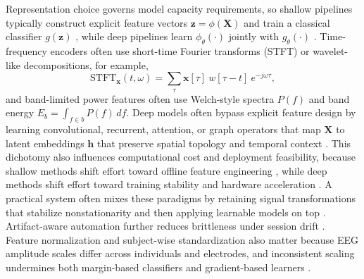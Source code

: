 \documentclass{WileyMSP-template}
\begin{document}
Representation choice governs model capacity requirements, so shallow pipelines typically construct explicit feature vectors $\mathbf{z}=\phi(\mathbf{X})$ and train a classical classifier $g(\mathbf{z})$ \cite{sbwank2019ikknpred}, while deep pipelines learn $\phi_\theta(\cdot)$ jointly with $g_\theta(\cdot)$ \cite{yroyhb2019deeplear}. Time-frequency encoders often use short-time Fourier transforms (STFT) or wavelet-like decompositions, for example,
\begin{equation}
\mathrm{STFT}_{\mathbf{x}}(t,\omega)=\sum_{\tau}\mathbf{x}[\tau]\ w[\tau-t]\ e^{-j\omega\tau},
\end{equation}
and band-limited power features often use Welch-style spectra $P(f)$ and band energy $E_b=\int_{f\in b}P(f)\,df$. Deep models often bypass explicit feature design by learning convolutional, recurrent, attention, or graph operators that map $\mathbf{X}$ to latent embeddings $\mathbf{h}$ that preserve spatial topology and temporal context \cite{sliuxw2020subjecti}. This dichotomy also influences computational cost and deployment feasibility, because shallow methods shift effort toward offline feature engineering \cite{thzhou2020waveletb}, while deep methods shift effort toward training stability and hardware acceleration \cite{jcheng2021emotionr}. A practical system often mixes these paradigms by retaining signal transformations that stabilize nonstationarity and then applying learnable models on top \cite{cysain2018automate}. Artifact-aware automation further reduces brittleness under session drift \cite{sphadi2021automati}. Feature normalization and subject-wise standardization also matter because EEG amplitude scales differ across individuals and electrodes, and inconsistent scaling undermines both margin-based classifiers and gradient-based learners \cite{smalar2019emotions}.
\end{document}
